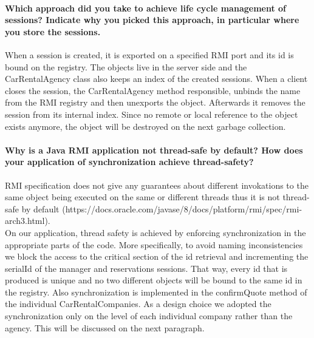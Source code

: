 \documentclass{ds-report}
\begin{document}
	\paragraph{Which approach did you take to achieve life cycle management of sessions? Indicate why you picked this approach, in particular where you store the sessions.\\}
    When a session is created, it is exported on a specified RMI port and its id is bound on the registry. The objects live in the server side
    and the CarRentalAgency class also keeps an index of the created sessions. When a client closes the session, the CarRentalAgency method responsible,
    unbinds the name from the RMI registry and then unexports the object. Afterwards it removes the session from its internal index.
    Since no remote or local reference to the object exists anymore, the object will be destroyed on the next garbage collection.
	
		
	\paragraph{Why is a Java RMI application not thread-safe by default? How does your application of synchronization achieve thread-safety?\\}
    RMI specification does not give any guarantees about different invokations to the same object being executed on the same or different threads
    thus it is not thread-safe by default (https://docs.oracle.com/javase/8/docs/platform/rmi/spec/rmi-arch3.html). \\
    On our application, thread safety is achieved by enforcing synchronization in the appropriate parts of the code. More specifically, to avoid
    naming inconsistencies we block the access to the critical section of the id retrieval and incrementing the serialId of the manager and reservations sessions.
    That way, every id that is produced is unique and no two different objects will be bound to the same id in the registry.
    Also synchronization is implemented in the confirmQuote method of the individual CarRentalCompanies. As a design choice we adopted
    the synchronization only on the level of each individual company rather than the agency. This will be discussed on the next paragraph.
\end{document}
